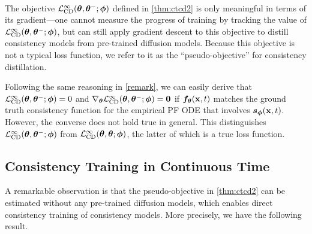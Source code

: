 \begin{appendices}
\begin{remark}
\begin{align}
    \end{align}
\end{remark}
\begin{remark}
    The objective $\mathcal{L}_\text{CD}^\infty({\bm{\theta}}, {\bm{\theta}}^{-}; {\bm{\phi}})$ defined in \cref{thm:ctcd2} is only meaningful in terms of its gradient---one cannot measure the progress of training by tracking the value of $\mathcal{L}_\text{CD}^\infty({\bm{\theta}}, {\bm{\theta}}^{-}; {\bm{\phi}})$, but can still apply gradient descent to this objective to distill consistency models from pre-trained diffusion models. Because this objective is not a typical loss function, we refer to it as the ``pseudo-objective'' for consistency distillation.
\end{remark}
\begin{remark}\label{remark2}
    Following the same reasoning in \cref{remark}, we can easily derive that $\mathcal{L}_\text{CD}^\infty({\bm{\theta}}, {\bm{\theta}}^{-}; {\bm{\phi}}) = 0$ and $\nabla_{\bm{\theta}} \mathcal{L}_\text{CD}^\infty({\bm{\theta}}, {\bm{\theta}}^{-}; {\bm{\phi}}) = \bm{0}$ if ${\bm{f}}_{\bm{\theta}}({\mathbf{x}}, t)$ matches the ground truth consistency function for the empirical PF ODE that involves ${\bm{s}}_{\bm{\phi}}({\mathbf{x}}, t)$. However, the converse does not hold true in general. This distinguishes $\mathcal{L}_\text{CD}^\infty({\bm{\theta}}, {\bm{\theta}}^{-}; {\bm{\phi}})$ from $\mathcal{L}_\text{CD}^\infty({\bm{\theta}}, {\bm{\theta}}; {\bm{\phi}})$, the latter of which is a true loss function.
\end{remark}

\subsection{Consistency Training in Continuous Time}\label{sec:ctct}
A remarkable observation is that the pseudo-objective in \cref{thm:ctcd2} can be estimated without any pre-trained diffusion models, which enables direct consistency training of consistency models. More precisely, we have the following result.


\end{appendices}
